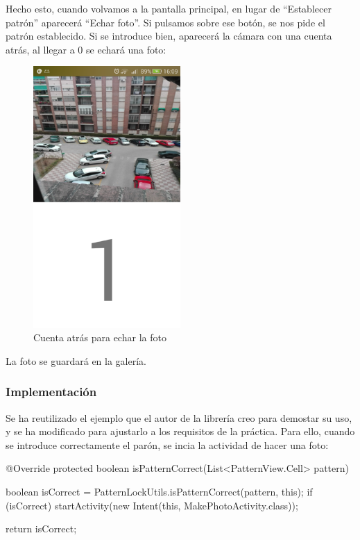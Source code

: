\documentclass[	DIV=calc,%
							paper=a4,%
							fontsize=11pt]{scrartcl}	 					%
\begin{document}
Hecho esto, cuando volvamos a la pantalla principal, en lugar de
``Establecer patrón'' aparecerá ``Echar foto''. Si pulsamos sobre ese
botón, se nos pide el patrón establecido. Si se introduce bien,
aparecerá la cámara con una cuenta atrás, al llegar a 0 se echará una
foto:

\begin{figure}[H]
\centering
\includegraphics[width=0.5\textwidth]{./img/countdown.png}
\caption{Cuenta atrás para echar la foto}
\end{figure}

La foto se guardará en la galería.

\subsubsection{Implementación}\label{implementaciuxf3n-2}

Se ha reutilizado el ejemplo que el autor de la librería creo para
demostar su uso, y se ha modificado para ajustarlo a los requisitos de
la práctica. Para ello, cuando se introduce correctamente el parón, se
incia la actividad de hacer una foto:

\begin{javacode}
	@Override
	protected boolean isPatternCorrect(List<PatternView.Cell> pattern) {

			boolean isCorrect = PatternLockUtils.isPatternCorrect(pattern, this);
			if (isCorrect) {
					startActivity(new Intent(this, MakePhotoActivity.class));
			}

			return isCorrect;
	}
\end{javacode}
\end{document}
